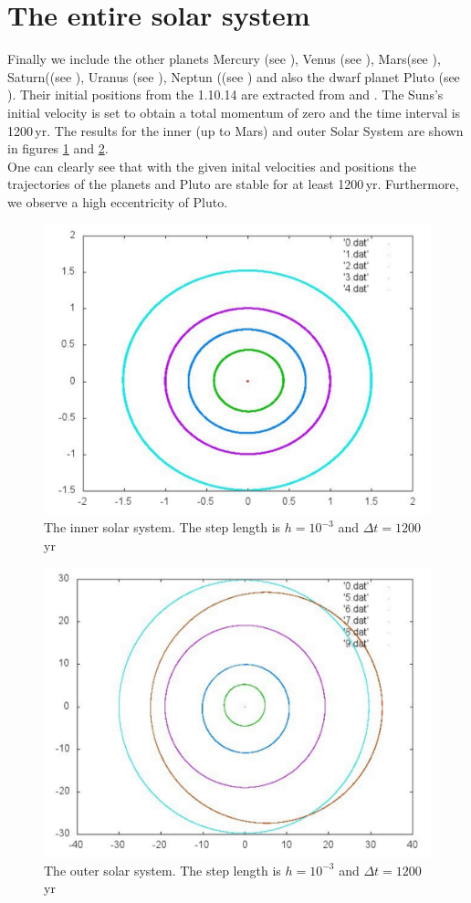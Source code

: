\documentclass[11pt,a4wide]{article}
\begin{document}
\section{The entire solar system}
Finally we include the other planets Mercury (see \cite{wiki:1}), Venus (see \cite{wiki:2}), Mars(see \cite{wiki:4}), Saturn((see \cite{wiki:6}), Uranus (see \cite{wiki:7}), Neptun ((see \cite{wiki:8}) and also the dwarf planet Pluto (see \cite{wiki:9}). Their initial positions from the 1.10.14 are extracted from \cite{astro} and \cite{NASA}. The Suns's initial velocity is set to obtain a total momentum of zero and the time interval is 1200\,yr. The results for the inner (up to Mars) and outer Solar System are shown in figures \ref{fig:solsysin} and \ref{fig:solsysout}.
\\
One can clearly see that with the given inital velocities and positions the  trajectories of the planets and Pluto are stable for at least 1200\,yr. Furthermore, we observe a high eccentricity of Pluto. 
	\begin{figure}
		\centering
			\includegraphics[scale=0.55]{1200yr.pdf}
		\caption{The inner solar system. The step length is $h=10^{-3}$ and $\Delta t=1200$\,yr}
		\label{fig:solsysin}
	\end{figure}
	
	
	\begin{figure}
		\centering
			\includegraphics[scale=0.55]{1200yrout.pdf}
		\caption{The outer solar system. The step length is $h=10^{-3}$ and $\Delta t=1200$\,yr}
		\label{fig:solsysout}
	\end{figure}


\end{document}
